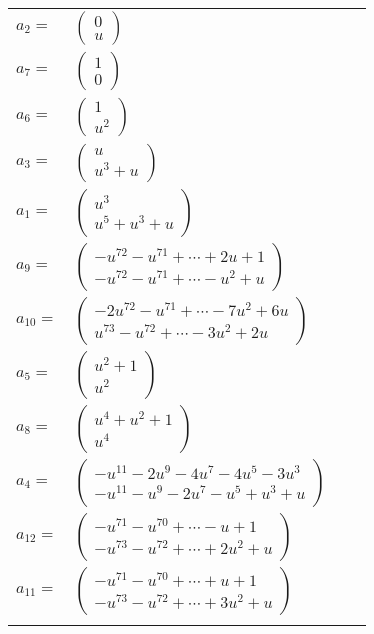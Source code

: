 \documentclass[1p]{elsarticle_modified}
\theoremstyle{definition}
\begin{document}
\begin{tabular}{m{7pt} m{180pt} m{7pt} m{180pt} }
\flushright $a_{2}=$&$\begin{pmatrix}0\\u\end{pmatrix}$ \\
\flushright $a_{7}=$&$\begin{pmatrix}1\\0\end{pmatrix}$ \\
\flushright $a_{6}=$&$\begin{pmatrix}1\\u^2\end{pmatrix}$ \\
\flushright $a_{3}=$&$\begin{pmatrix}u\\u^3+u\end{pmatrix}$ \\
\flushright $a_{1}=$&$\begin{pmatrix}u^3\\u^5+u^3+u\end{pmatrix}$ \\
\flushright $a_{9}=$&$\begin{pmatrix}- u^{72}- u^{71}+\cdots+2 u+1\\- u^{72}- u^{71}+\cdots- u^2+u\end{pmatrix}$ \\
\flushright $a_{10}=$&$\begin{pmatrix}-2 u^{72}- u^{71}+\cdots-7 u^2+6 u\\u^{73}- u^{72}+\cdots-3 u^2+2 u\end{pmatrix}$ \\
\flushright $a_{5}=$&$\begin{pmatrix}u^2+1\\u^2\end{pmatrix}$ \\
\flushright $a_{8}=$&$\begin{pmatrix}u^4+u^2+1\\u^4\end{pmatrix}$ \\
\flushright $a_{4}=$&$\begin{pmatrix}- u^{11}-2 u^9-4 u^7-4 u^5-3 u^3\\- u^{11}- u^9-2 u^7- u^5+u^3+u\end{pmatrix}$ \\
\flushright $a_{12}=$&$\begin{pmatrix}- u^{71}- u^{70}+\cdots- u+1\\- u^{73}- u^{72}+\cdots+2 u^2+u\end{pmatrix}$ \\
\flushright $a_{11}=$&$\begin{pmatrix}- u^{71}- u^{70}+\cdots+u+1\\- u^{73}- u^{72}+\cdots+3 u^2+u\end{pmatrix}$\\&\end{tabular}
\end{document}
